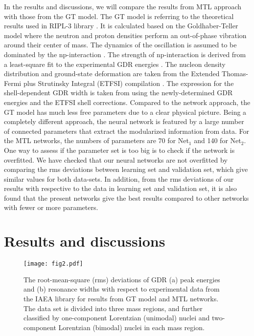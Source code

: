 \documentclass[twocolumn,showpacs,superscriptaddress,amsmath,amssymb,prc,preprintnumbers]{revtex4-1}
\begin{document}
In the results and discussions, we will compare the results from MTL approach with those from the GT model. The GT model is referring to the theoretical results used in RIPL-3 library \cite{RIPL3}. It is calculated  based on the Goldhaber-Teller model \cite{Goldhaber1948} where the neutron and proton densities perform an out-of-phase vibration around their center of mass. The dynamics of the oscillation is assumed to be dominated by the np-interaction \cite{Isacker1992}. The strength of np-interaction is derived from a least-square fit to the experimental GDR energies \cite{Goriely199810}. The nucleon density distribution and ground-state deformation are taken from the Extended Thomas-Fermi plus Strutinsky Integral (ETFSI) compilation \cite{Aboussir1995}. The expression for the shell-dependent GDR width is taken from \cite{Thielemann1983} using the newly-determined GDR energies and the ETFSI shell corrections. Compared to the network approach, the GT model has much less free parameters due to a clear physical picture. Being a completely different approach, the neural network is featured by a large number of connected parameters that extract the modularized information from data. For the MTL networks, the numbers of parameters are 70 for Net$_1$ and 140 for Net$_2 $. One way to assess if the parameter set is too big is to check if the network is overfitted. We have checked that our neural networks are not overfitted by comparing the rms deviations between learning set and validation set, which give similar values for both data-sets. In addition, from the rms deviations of our results with respective to the data in learning set and validation set, it is also found that the present networks give the best results compared to other networks with fewer or more parameters.


\section{Results and discussions}


\begin{figure}[htbp]\setlength{\abovecaptionskip}{0.0em}
\texttt{[image: fig2.pdf]}
\caption{ The root-mean-square (rms) deviations of GDR (a) peak energies and (b) resonance widths  with respect to experimental data from the IAEA library \cite{Plujko2018} for results from GT model \cite{RIPL3} and MTL networks. The data set is divided into three mass regions, and
  further classified by one-component Lorentzian (unimodal) nuclei and two-component Lorentzian (bimodal) nuclei in each mass region.}\label{fig:fig2}
\end{figure}
\end{document}
